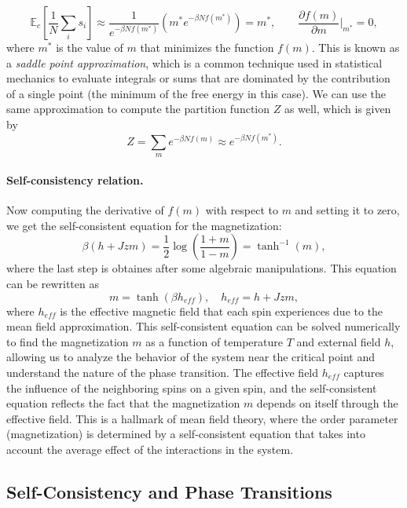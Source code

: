 \[
    \mathbb{E}_c \left[ \frac{1}{N} \sum_{i} s_i \right] \approx \frac{1}{e^{-\beta N f(m^*)}} \left( m^* e^{-\beta N f(m^*)} \right) = m^*, \qquad \frac{\partial f(m)}{\partial m}\bigg|_{m^*} = 0,
\]
where \(m^*\) is the value of \(m\) that minimizes the function \(f(m)\). This is known as a \textit{saddle point approximation}, which is a common technique used in statistical mechanics to evaluate integrals or sums that are dominated by the contribution of a single point (the minimum of the free energy in this case). We can use the same approximation to compute the partition function \(Z\) as well, which is given by
\[
    Z = \sum_{m} e^{-\beta N f(m)} \approx e^{-\beta N f(m^*)}.
\]

\paragraph{Self-consistency relation.}
Now computing the derivative of \(f(m)\) with respect to \(m\) and setting it to zero, we get the self-consistent equation for the magnetization:
\[
    \beta(h + J z m) = \frac{1}{2} \log\left( \frac{1+m}{1-m} \right) = \tanh^{-1}(m),
\]
where the last step is obtaines after some algebraic manipulations. This equation can be rewritten as
\[
    m = \tanh\left( \beta h_{eff} \right), \quad h_{eff} = h + J z m,
\]
where \(h_{eff}\) is the effective magnetic field that each spin experiences due to the mean field approximation. This self-consistent equation can be solved numerically to find the magnetization \(m\) as a function of temperature \(T\) and external field \(h\), allowing us to analyze the behavior of the system near the critical point and understand the nature of the phase transition. The effective field \(h_{eff}\) captures the influence of the neighboring spins on a given spin, and the self-consistent equation reflects the fact that the magnetization \(m\) depends on itself through the effective field. This is a hallmark of mean field theory, where the order parameter (magnetization) is determined by a self-consistent equation that takes into account the average effect of the interactions in the system.

\subsection{Self-Consistency and Phase Transitions}

